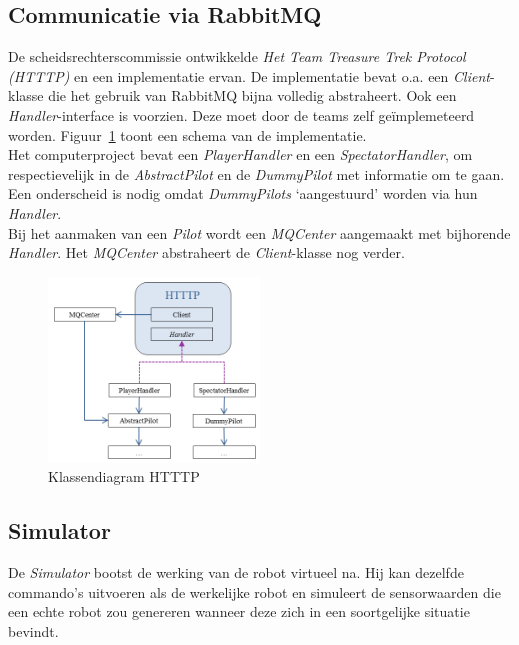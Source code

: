 \documentclass[tt3]{penoverslag}
\begin{document}
\subsection{Communicatie via RabbitMQ}
\label{ssec:RabbMQ}
De scheidsrechterscommissie ontwikkelde \textit{Het Team Treasure Trek Protocol (HTTTP)} en een implementatie ervan. De implementatie bevat o.a. een \textit{Client}-klasse die het gebruik van RabbitMQ bijna volledig abstraheert. Ook een \textit{Handler}-interface is voorzien. Deze moet door de teams zelf ge\"implemeteerd worden. Figuur~\ref{fig:klasHTTTP} toont een schema van de implementatie.\\

Het computerproject bevat een \textit{PlayerHandler} en een \textit{SpectatorHandler}, om respectievelijk in de \textit{AbstractPilot} en de \textit{DummyPilot} met informatie om te gaan. Een onderscheid is nodig omdat \textit{DummyPilots} `aangestuurd' worden via hun \textit{Handler}.\\

Bij het aanmaken van een \textit{Pilot} wordt een \textit{MQCenter} aangemaakt met bijhorende \textit{Handler}. Het \textit{MQCenter} abstraheert de \textit{Client}-klasse nog verder.

\begin{figure}[h]
\centering
	\includegraphics[width=0.5\textwidth]{KlasHTTTP}
\caption{Klassendiagram HTTTP}
\label{fig:klasHTTTP}
\end{figure}


\subsection{Simulator}
\label{ssec:Sim}
De \textit{Simulator} bootst de werking van de robot virtueel na. Hij kan dezelfde commando's uitvoeren als de werkelijke robot en simuleert de sensorwaarden die een echte robot zou genereren wanneer deze zich in een soortgelijke situatie bevindt.\\
\end{document}
